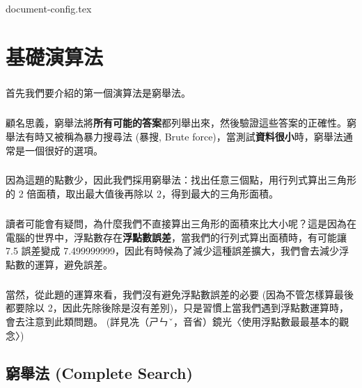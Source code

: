\documentclass[12pt,a4paper,oneside]{report}
\begin{document}
\begin{CJK}{UTF8}{bkai}

{document-config.tex}
\setcounter{chapter}{1}

\fi

\chapter{基礎演算法}

\paragraph{}首先我們要介紹的第一個演算法是窮舉法。

\paragraph{}顧名思義，窮舉法將\textbf{所有可能的答案}都列舉出來，然後驗證這些答案的正確性。窮舉法有時又被稱為暴力搜尋法 (暴搜, Brute force)，當測試\textbf{資料很小}時，窮舉法通常是一個很好的選項。

\paragraph{}因為這題的點數少，因此我們採用窮舉法：找出任意三個點，用行列式算出三角形的 2 倍面積，取出最大值後再除以 2，得到最大的三角形面積。

\paragraph{}讀者可能會有疑問，為什麼我們不直接算出三角形的面積來比大小呢？這是因為在電腦的世界中，浮點數存在\textbf{浮點數誤差}，當我們的行列式算出面積時，有可能讓 7.5 誤差變成 7.499999999，因此有時候為了減少這種誤差擴大，我們會去減少浮點數的運算，避免誤差。

\paragraph{}當然，從此題的運算來看，我們沒有避免浮點數誤差的必要 (因為不管怎樣算最後都要除以 2，因此先除後除是沒有差別)，只是習慣上當我們遇到浮點數運算時，會去注意到此類問題。 (詳見冼（ㄕㄣˇ，音省）鏡光〈使用浮點數最最基本的觀念〉)

\section{窮舉法 (Complete Search)}


\end{CJK}
\end{document}
